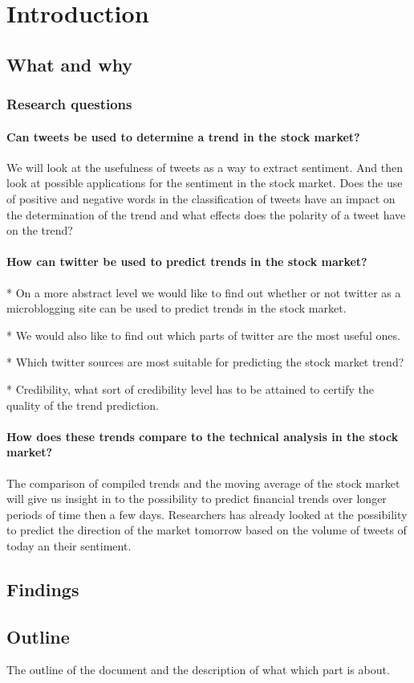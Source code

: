 \section{Introduction}

\subsection{What and why}

\subsubsection{Research questions}
	\paragraph{Can tweets be used to determine a trend in the stock market?\\}
	We will look at the usefulness of tweets as a way to extract sentiment. And
then look at possible applications for the sentiment in the stock market. 
Does the use of positive and negative words in the classification of tweets
have an impact on the determination of the trend and what effects does the
polarity of a tweet have on the trend?

	\paragraph{How can twitter be used to predict trends in the stock market?\\}
* On a more abstract level we would like to find out whether or not twitter as a
microblogging site can be used to predict trends in the stock market.

* We would also like to find out which parts of twitter are the most useful
ones. 

* Which twitter sources are most suitable for predicting the stock market
trend?

* Credibility, what sort of credibility level has to be attained to certify the
quality of the trend prediction. 

	\paragraph{How does these trends compare to the technical analysis in the
stock market?\\}
	The comparison of compiled trends and the moving average of the stock
market will  give us insight in to the possibility to predict financial trends
over longer periods of time then a few days. Researchers has already looked at
the possibility to predict the direction of the market tomorrow based on the
volume of tweets of today an their sentiment. 

\subsection{Findings}

\subsection{Outline}
The outline of the document and the description of what which part is about. 


